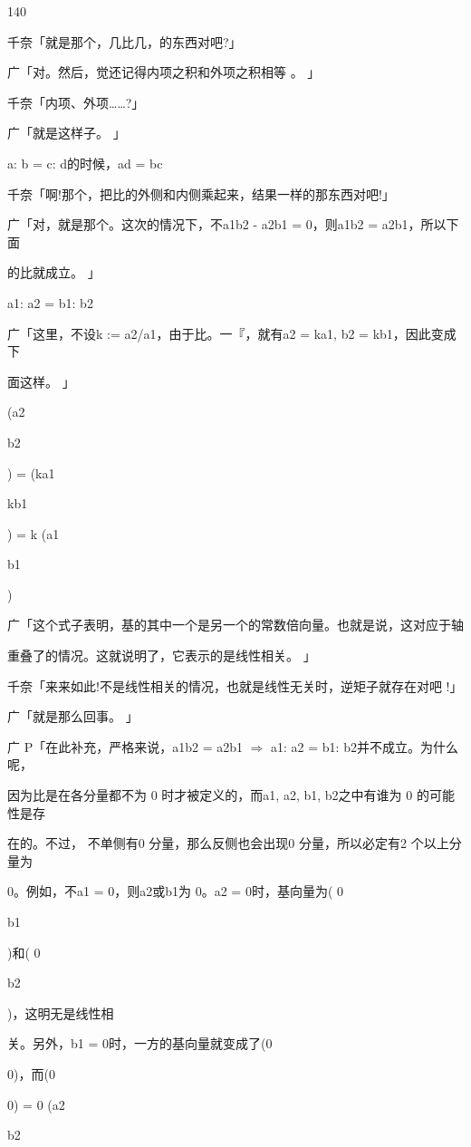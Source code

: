 140\par
千奈「就是那个，几比几，的东西对吧?」\par
广「对。然后，觉还记得内项之积和外项之积相等 。 」\par
千奈「内项、外项……?」\par
广「就是这样子。 」\par
a: b = c: d的时候，ad = bc\par
千奈「啊!那个，把比的外侧和内侧乘起来，结果一样的那东西对吧!」\par
广「对，就是那个。这次的情况下，不a1b2 - a2b1 = 0，则a1b2 = a2b1，所以下面\par
的比就成立。 」\par
a1: a2 = b1: b2\par
广「这里，不设k := a2/a1，由于比。一『，就有a2 = ka1, b2 = kb1，因此变成下\par
面这样。 」\par
(a2\par
b2\par
) = (ka1\par
kb1\par
) = k (a1\par
b1\par
)\par
广「这个式子表明，基的其中一个是另一个的常数倍向量。也就是说，这对应于轴\par
重叠了的情况。这就说明了，它表示的是线性相关。 」\par
千奈「来来如此!不是线性相关的情况，也就是线性无关时，逆矩子就存在对吧 !」\par
广「就是那么回事。 」\par
广 P「在此补充，严格来说，a1b2 = a2b1 $\Rightarrow$ a1: a2 = b1: b2并不成立。为什么呢，\par
因为比是在各分量都不为 0 时才被定义的，而a1, a2, b1, b2之中有谁为 0 的可能性是存\par
在的。不过， 不单侧有0 分量，那么反侧也会出现0 分量，所以必定有2 个以上分量为\par
0。例如，不a1 = 0，则a2或b1为 0。a2 = 0时，基向量为( 0\par
b1\par
)和( 0\par
b2\par
)，这明无是线性相\par
关。另外，b1 = 0时，一方的基向量就变成了(0\par
0)，而(0\par
0) = 0 (a2\par
b2\par
